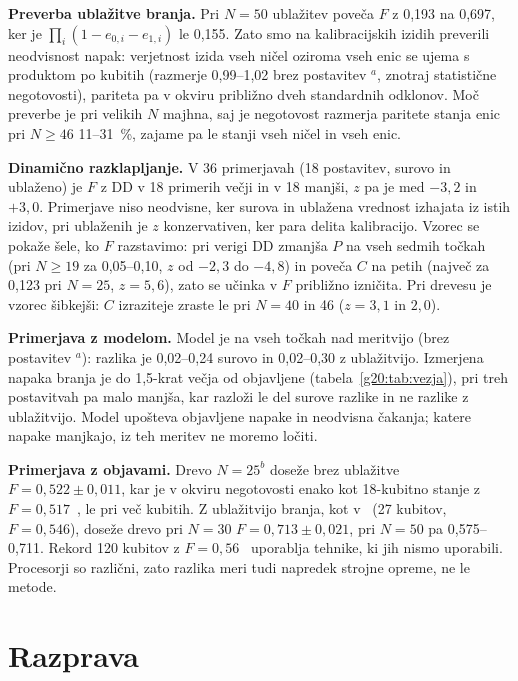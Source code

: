 \textbf{Preverba ublažitve branja.} Pri $N=50$ ublažitev poveča $F$ z 0,193 na 0,697, ker je $\prod_i(1-e_{0,i}-e_{1,i})$ le 0,155. Zato smo
na kalibracijskih izidih preverili neodvisnost napak: verjetnost izida vseh ničel oziroma vseh enic se ujema s produktom po
kubitih (razmerje 0,99--1,02 brez postavitev $^a$, znotraj statistične negotovosti), pariteta pa v okviru približno dveh standardnih odklonov. Moč preverbe je
pri velikih $N$ majhna, saj je negotovost razmerja paritete stanja enic pri $N\ge46$ 11--31~\%, zajame pa le stanji vseh ničel in
vseh enic.

\textbf{Dinamično razklapljanje.} V 36 primerjavah (18 postavitev, surovo in ublaženo) je $F$ z DD v 18 primerih večji in v 18
manjši, $z$ pa je med $-3{,}2$ in $+3{,}0$. Primerjave niso neodvisne, ker surova in ublažena vrednost izhajata iz istih izidov, pri
ublaženih je $z$ konzervativen, ker para delita kalibracijo. Vzorec se pokaže šele, ko $F$ razstavimo: pri verigi DD zmanjša $P$ na vseh
sedmih točkah (pri $N\ge19$ za 0,05--0,10, $z$ od $-2{,}3$ do $-4{,}8$) in poveča $C$ na petih (največ za 0,123 pri $N=25$, $z=5{,}6$),
zato se učinka v $F$ približno izničita. Pri drevesu je vzorec šibkejši: $C$ izraziteje zraste le pri $N=40$ in 46 ($z=3{,}1$ in $2{,}0$).

\textbf{Primerjava z modelom.} Model je na vseh točkah nad meritvijo (brez postavitev $^a$): razlika je 0,02--0,24 surovo in 0,02--0,30 z
ublažitvijo. Izmerjena napaka branja je do 1,5-krat večja od objavljene (tabela~\ref{g20:tab:vezja}), pri treh postavitvah pa malo
manjša, kar razloži le del surove razlike in ne razlike z ublažitvijo. Model upošteva objavljene napake in neodvisna čakanja; katere
napake manjkajo, iz teh meritev ne moremo ločiti.

\textbf{Primerjava z objavami.} Drevo $N=25^b$ doseže brez ublažitve $F=0{,}522\pm0{,}011$, kar je v okviru negotovosti enako kot 18-kubitno stanje z
$F=0{,}517$~\cite{g20:wei2020}, le pri več kubitih. Z ublažitvijo branja, kot v~\cite{g20:mooney2021} (27 kubitov, $F=0{,}546$), doseže drevo pri $N=30$
$F=0{,}713\pm0{,}021$, pri $N=50$ pa 0,575--0,711. Rekord 120 kubitov z $F=0{,}56$~\cite{g20:ibm2025bigcats} uporablja tehnike, ki jih
nismo uporabili. Procesorji so različni, zato razlika meri tudi napredek strojne opreme, ne le metode.


\section{Razprava}
\label{g20:sec:razprava}

